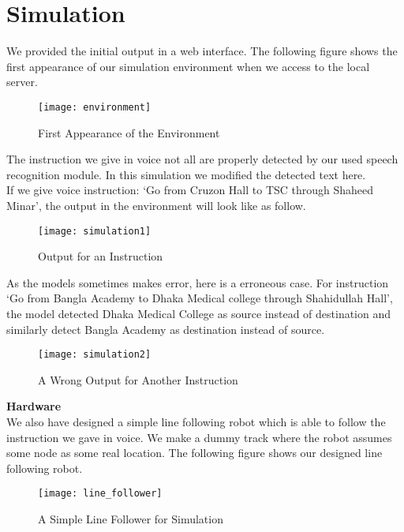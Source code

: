 \chapter{Simulation}
	We provided the initial output in a web interface. The following figure shows the first appearance of our simulation environment when we access to the local server. \\
	
	\begin{figure}[H]
		\centering
		\texttt{[image: environment]}
		\caption{First Appearance of the Environment}
	\end{figure}
	\vline
	
	The instruction we give in voice not all are properly detected by our used speech recognition module. In this simulation we modified the detected text here.\\
	
	If we give voice instruction: `Go from Cruzon Hall to TSC through Shaheed Minar', the output in the environment will look like as follow. \\
	\begin{figure}[H]
        \centering
        \texttt{[image: simulation1]}
        \caption{Output for an Instruction}
    \end{figure}
    \vline
	
	As the models sometimes makes error, here is a erroneous case. For instruction `Go from Bangla Academy to Dhaka Medical college through Shahidullah Hall', the model detected Dhaka Medical College as source instead of destination and similarly detect Bangla Academy as destination instead of source. \\
	\begin{figure}[H]
        \centering
        \texttt{[image: simulation2]}
        \caption{A Wrong Output for Another Instruction}
    \end{figure}
    \vline
	
	\textbf{Hardware} \\
	We also have designed a simple line following robot which is able to follow the instruction we gave in voice. We make a dummy track where the robot assumes some node as some real location. The following figure shows our designed line following robot.
	\begin{figure}[H]
		\centering
		\texttt{[image: line\_follower]}
		\caption{A Simple Line Follower for Simulation}
	\end{figure}
	\vline